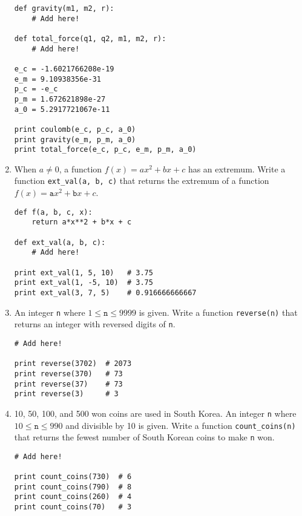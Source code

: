 \documentclass[../main.tex]{subfiles}
\begin{document}
\begin{enumerate}
\begin{verbatim}
def gravity(m1, m2, r):
	# Add here!

def total_force(q1, q2, m1, m2, r):
	# Add here!

e_c = -1.6021766208e-19
e_m = 9.10938356e-31
p_c = -e_c
p_m = 1.672621898e-27
a_0 = 5.2917721067e-11

print coulomb(e_c, p_c, a_0)
print gravity(e_m, p_m, a_0)
print total_force(e_c, p_c, e_m, p_m, a_0)
\end{verbatim}

\item When $a \neq 0$, a function $f(x) = ax^2 + bx + c$ has an extremum.
Write a function \texttt{ext\_val(a, b, c)} that returns the extremum of a function $f(x) = \texttt{a}x^2 + \texttt{b}x + c$.
\begin{verbatim}
def f(a, b, c, x):
	return a*x**2 + b*x + c

def ext_val(a, b, c):
	# Add here!

print ext_val(1, 5, 10)   # 3.75
print ext_val(1, -5, 10)  # 3.75
print ext_val(3, 7, 5)    # 0.916666666667
\end{verbatim}

\item An integer \texttt{n} where $1 \leq \texttt{n} \leq 9999$ is given. Write a function \texttt{reverse(n)} that returns an integer with reversed digits of \texttt{n}.
\begin{verbatim}
# Add here!

print reverse(3702)  # 2073
print reverse(370)   # 73
print reverse(37)    # 73
print reverse(3)     # 3
\end{verbatim}

\item 10, 50, 100, and 500 won coins are used in South Korea. An integer \texttt{n} where $10 \leq \texttt{n} \leq 990$ and divisible by 10 is given. Write a function \texttt{count\_coins(n)} that returns the fewest number of South Korean coins to make \texttt{n} won.
\begin{verbatim}
# Add here!

print count_coins(730)  # 6
print count_coins(790)  # 8
print count_coins(260)  # 4
print count_coins(70)   # 3
\end{verbatim}


\end{enumerate}
\end{document}
